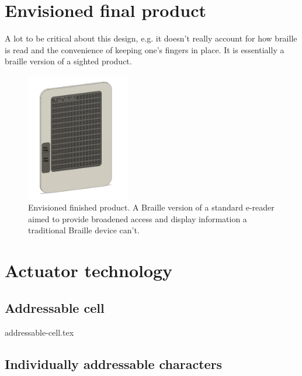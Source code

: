 \section{Envisioned final product}
A lot to be critical about this design, e.g. it doesn't really account for how braille is read and the convenience of keeping one's fingers in place. It is essentially a braille version of a sighted product.
\begin{figure}
\centering
    \includegraphics[width=0.4\textwidth]{figures/e-reader.png}
\caption[Envisioned finished product]{Envisioned finished product. A Braille version of a standard e-reader aimed to provide broadened access and display information a traditional Braille device can't.}
\label{fig:e-reader.png}
\end{figure}


\section{Actuator technology}
    \subsection{Addressable cell}
        {addressable-cell.tex}
    \subsection{Individually addressable characters}

